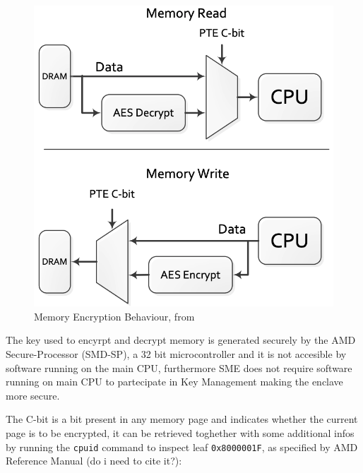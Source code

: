 \documentclass[twocolumn]{article}
\begin{document}
\begin{figure}
    \centering
    \includegraphics[scale=0.25]{img/read-write.png}
    \caption{Memory Encryption Behaviour, from \cite{memory-encryption}}
\end{figure}

The key used to encyrpt and decrypt memory is generated securely by the AMD Secure-Processor (SMD-SP), a 32 bit microcontroller and it is not accesible by software running on the main CPU, furthermore SME does not require software running on main CPU to partecipate in Key Management making the enclave more secure.

The C-bit is a bit present in any memory page and indicates whether the current page is to be encrypted, it can be retrieved toghether with some additional infos by running the \texttt{cpuid} command to inspect leaf \texttt{0x8000001F}, as specified by AMD Reference Manual (do i need to cite it?):
\end{document}
